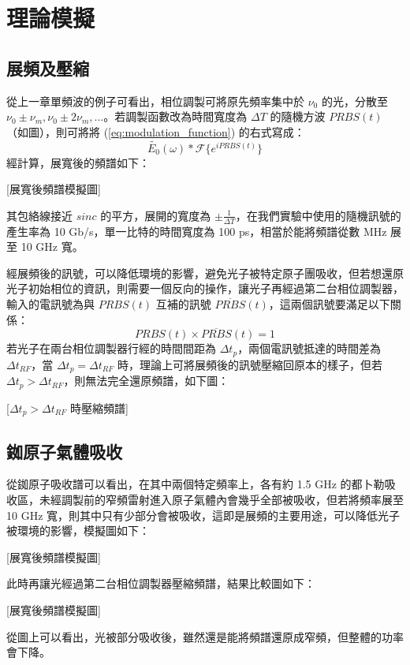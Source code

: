 \documentclass[class=NCU_thesis, crop=false]{standalone}
\begin{document}
\chapter{理論模擬}
\section{展頻及壓縮}
從上一章單頻波的例子可看出，相位調製可將原先頻率集中於 $\nu_{0}$ 的光，分散至 $\nu_{0}\pm\nu_{m}, \nu_{0}\pm2\nu_{m},\dots$。若調製函數改為時間寬度為 $\Delta T$ 的隨機方波 $PRBS(t)$ （如圖），則可將將 (\ref{eq:modulation_function}) 的右式寫成：
\begin{equation}
    \tilde{E_{0}}(\omega)*\mathscr{F}\{{e^{i PRBS(t)}}\}
\end{equation}
經計算，展寬後的頻譜如下：

[展寬後頻譜模擬圖]

其包絡線接近 $sinc$ 的平方，展開的寬度為 $\pm\frac{1}{\Delta T}$，在我們實驗中使用的隨機訊號的產生率為 10 Gb/s，單一比特的時間寬度為 100 ps，相當於能將頻譜從數 MHz 展至 10 GHz 寬。

經展頻後的訊號，可以降低環境的影響，避免光子被特定原子團吸收，但若想還原光子初始相位的資訊，則需要一個反向的操作，讓光子再經過第二台相位調製器，輸入的電訊號為與 $PRBS(t)$ 互補的訊號 $\overline{PRBS}(t)$，這兩個訊號要滿足以下關係：
\begin{equation}
    PRBS(t)\times \overline{PRBS}(t)=1
\end{equation}
若光子在兩台相位調製器行經的時間間距為 $\Delta t_{p}$，兩個電訊號抵達的時間差為 $\Delta t_{RF}$，當 $\Delta t_{p}=\Delta t_{RF}$ 時，理論上可將展頻後的訊號壓縮回原本的樣子，但若 $\Delta t_{p}>\Delta t_{RF}$，則無法完全還原頻譜，如下圖：

[$\Delta t_{p}>\Delta t_{RF}$ 時壓縮頻譜]

\section{銣原子氣體吸收}
從銣原子吸收譜可以看出，在其中兩個特定頻率上，各有約 1.5 GHz 的都卜勒吸收區，未經調製前的窄頻雷射進入原子氣體內會幾乎全部被吸收，但若將頻率展至 10 GHz 寬，則其中只有少部分會被吸收，這即是展頻的主要用途，可以降低光子被環境的影響，模擬圖如下：

[展寬後頻譜模擬圖]

此時再讓光經過第二台相位調製器壓縮頻譜，結果比較圖如下：

[展寬後頻譜模擬圖]

從圖上可以看出，光被部分吸收後，雖然還是能將頻譜還原成窄頻，但整體的功率會下降。
\end{document}

